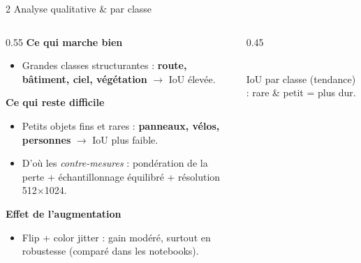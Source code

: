 \documentclass[aspectratio=169,11pt]{beamer}
\newcommand{\emphc}[1]{\textbf{\color{cvblue}#1}}
\begin{document}
\begin{frame}{2 \textbar{} Analyse qualitative \& par classe}
  \begin{columns}[T]
    \begin{column}{0.55\textwidth}
      \textbf{Ce qui marche bien}
      \begin{itemize}\footnotesize
        \item Grandes classes structurantes : \emphc{route, bâtiment, ciel,
          végétation} $\rightarrow$ IoU élevée.
      \end{itemize}
      \vspace{0.3em}
      \textbf{Ce qui reste difficile}
      \begin{itemize}\footnotesize
        \item Petits objets fins et rares : \emphc{panneaux, vélos, personnes}
          $\rightarrow$ IoU plus faible.
        \item D'où les \emph{contre-mesures} : pondération de la perte +
          échantillonnage équilibré + résolution 512$\times$1024.
      \end{itemize}
      \vspace{0.3em}
      \textbf{Effet de l'augmentation}
      \begin{itemize}\footnotesize
        \item Flip + color jitter : gain modéré, surtout en robustesse
          (comparé dans les notebooks).
      \end{itemize}
    \end{column}
    \begin{column}{0.45\textwidth}
      \centering
      \\[0.3em]
      {\footnotesize IoU par classe (tendance) : rare \& petit = plus dur.}
    \end{column}
  \end{columns}
\end{frame}
\end{document}
